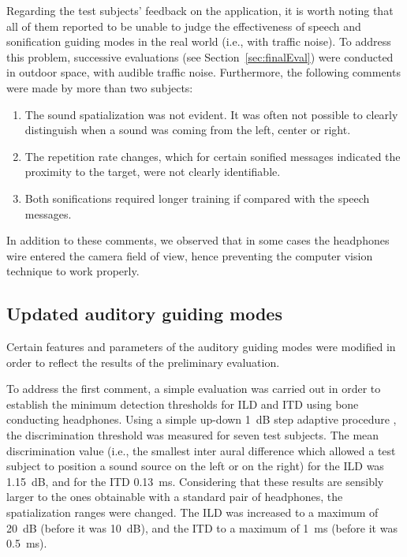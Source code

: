 \documentclass{article}
\begin{document}
Regarding the test subjects' feedback on the application, it is worth noting that all of them reported to be unable to judge the effectiveness of speech and sonification guiding modes in the real world (i.e., with traffic noise).
To address this problem, successive evaluations (see Section~\ref{sec:finalEval}) were conducted in outdoor space, with audible traffic noise.
Furthermore, the following  comments were made by more than two subjects:

\begin{enumerate}
\item The sound spatialization was not evident. It was often not possible to clearly distinguish when a sound was coming from the left, center or right.
\item The repetition rate changes, which for certain sonified messages indicated the proximity to the target, were not clearly identifiable.
\item Both sonifications required longer training if compared with the speech messages.
\end{enumerate}

In addition to these comments, we observed that in some cases the headphones wire entered the camera field of view, hence preventing the computer vision technique to work properly.

\subsection{Updated auditory guiding modes}
\label{UpdSon}
Certain features and parameters of the auditory guiding modes were modified in order to reflect the results of the preliminary evaluation.

To address the first comment, a simple evaluation was carried out in order to establish the minimum detection thresholds for ILD and ITD using bone conducting headphones.
Using a simple up-down 1~dB step adaptive procedure \cite{Levitt1978}, the discrimination threshold was measured for seven test subjects. The mean discrimination value (i.e., the smallest inter aural difference which allowed a test subject to position a sound source on the left or on the right) for the ILD was 1.15~dB, and for the ITD 0.13~ms.
Considering that these results are sensibly larger to the ones obtainable with a standard pair of headphones, the spatialization ranges were changed. The ILD was increased to a maximum of 20~dB (before it was 10~dB), and the ITD to a maximum of 1~ms (before it was 0.5~ms).
\end{document}
